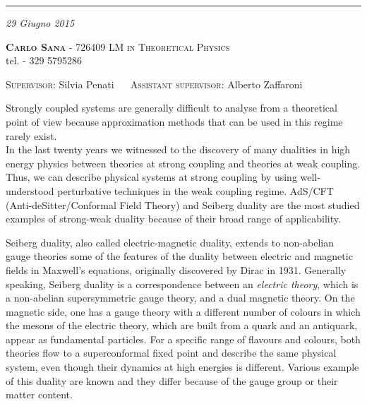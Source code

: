 \documentclass[a4paper,11pt]{article}
\date{}
\title{ \textbf{\boldmath{4D to 3D reduction of Seiberg duality for $SU(N)$ susy gauge theories with adjoint matter: a partition function approach }}	}
\author{}
\begin{document}
\maketitle
\vspace*{-2.3cm}
\begin{center}
\rule{\textwidth}{0.6pt}
\textit {29 Giugno 2015} \\
 \end{center}
\vspace{-0.3cm}
	 \textbf{\noindent%
	 \scshape%
	 Carlo Sana}  - \textsf{ 726409}  \hfill
 {\scshape LM in Theoretical Physics} 
\\
\noindent  tel.  \textsf {- 329 5795286}\\
\vspace{-0.5cm}
\begin{center}
{\scshape Supervisor}: 
\textsf{Silvia Penati} 
~~
{\scshape Assistant supervisor}:
\textsf{Alberto Zaffaroni}

\end{center}



Strongly coupled systems are generally difficult to analyse from a theoretical point of view because approximation methods that can be used in this regime rarely exist.\\
In the last twenty years we witnessed to the discovery of many dualities in high energy physics between theories at strong coupling and theories at weak coupling.
Thus, we can describe physical systems at strong coupling by using well-understood perturbative techniques in the weak coupling regime. 
AdS/CFT (Anti-deSitter/Conformal Field Theory) and Seiberg duality are the most studied examples of strong-weak duality because of their broad range of applicability.

Seiberg duality, also called electric-magnetic duality, extends to non-abelian gauge theories some of the features of the duality between electric and magnetic fields in Maxwell's equations, originally discovered by Dirac in 1931.
Generally speaking, Seiberg duality is a correspondence between an \emph{electric theory}, which is a non-abelian supersymmetric gauge theory, and a dual magnetic theory. 
On the magnetic side, one has a gauge theory with a different number of colours  in which the mesons of the electric theory, which are built from a quark and an antiquark, appear as fundamental particles.
For a specific range of flavours and colours, both theories flow to a superconformal fixed point and describe the same physical system, even though their dynamics at high energies is different.
Various example of this duality are known and they differ because of the gauge group or their matter content.
\end{document}

